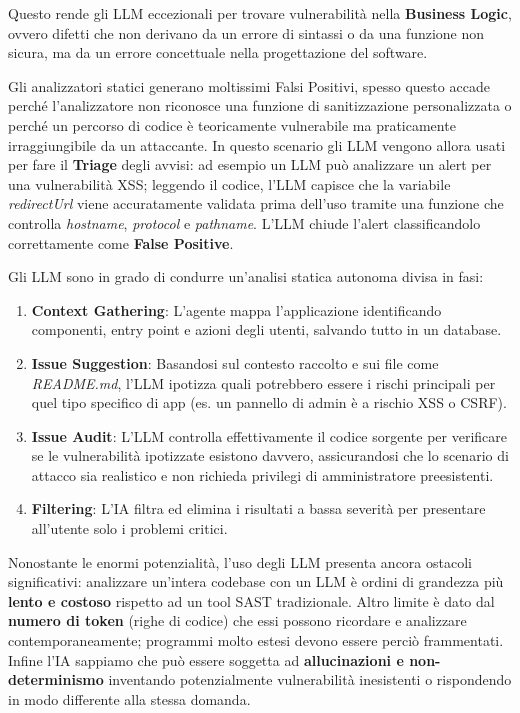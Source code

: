 Questo rende gli LLM eccezionali per trovare vulnerabilità nella \textbf{Business Logic}, 
ovvero difetti che non derivano da un errore di sintassi o da una funzione non sicura, 
ma da un errore concettuale nella progettazione del software.

Gli analizzatori statici generano moltissimi Falsi Positivi, spesso questo accade 
perché l'analizzatore non riconosce una funzione di sanitizzazione personalizzata 
o perché un percorso di codice è teoricamente vulnerabile ma praticamente 
irraggiungibile da un attaccante. In questo scenario gli LLM vengono allora usati per 
fare il \textbf{Triage} degli avvisi: ad esempio un LLM può analizzare un alert per 
una vulnerabilità XSS; leggendo il codice, l'LLM capisce che la variabile \textit{redirectUrl}
viene accuratamente validata prima dell'uso tramite una funzione che controlla 
\textit{hostname}, \textit{protocol} e \textit{pathname}. L'LLM chiude l'alert classificandolo 
correttamente come \textbf{False Positive}.

Gli LLM sono in grado di condurre un'analisi statica autonoma divisa in fasi:

\begin{enumerate}
    \item \textbf{Context Gathering}: L'agente mappa l'applicazione identificando 
    componenti, entry point e azioni degli utenti, salvando tutto in un database.
    \item \textbf{Issue Suggestion}: Basandosi sul contesto raccolto e sui file come 
    \textit{README.md}, l'LLM ipotizza quali potrebbero essere i rischi principali 
    per quel tipo specifico di app (es. un pannello di admin è a rischio XSS o CSRF).
    \item \textbf{Issue Audit}: L'LLM controlla effettivamente il codice sorgente 
    per verificare se le vulnerabilità ipotizzate esistono davvero, assicurandosi 
    che lo scenario di attacco sia realistico e non richieda privilegi di 
    amministratore preesistenti.
    \item \textbf{Filtering}: L'IA filtra ed elimina i risultati a bassa severità 
    per presentare all'utente solo i problemi critici.
\end{enumerate}

Nonostante le enormi potenzialità, l'uso degli LLM presenta ancora ostacoli 
significativi: analizzare un'intera codebase con un LLM è ordini di grandezza più 
\textbf{lento e costoso} rispetto ad un tool SAST tradizionale. Altro limite è dato 
dal \textbf{numero di token} (righe di codice) che essi possono ricordare e analizzare contemporaneamente;
programmi molto estesi devono essere perciò frammentati. Infine l'IA sappiamo che 
può essere soggetta ad \textbf{allucinazioni e non-determinismo} inventando potenzialmente 
vulnerabilità inesistenti o rispondendo in modo differente alla stessa domanda.

